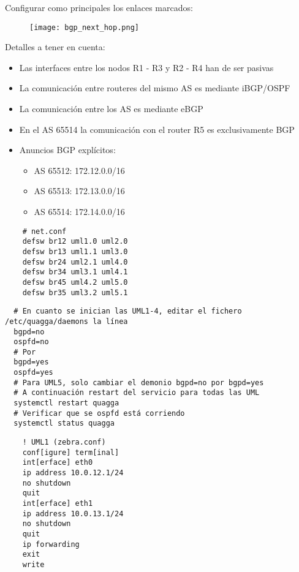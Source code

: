 Configurar como principales los enlaces marcados:
  \begin{figure}[h]
    \texttt{[image: bgp\_next\_hop.png]}
  \end{figure}

  Detalles a tener en cuenta:

  \begin{itemize}
    \item Las interfaces entre los nodos R1 - R3 y R2 - R4 han de ser pasivas
    \item La comunicación entre routeres del mismo AS es mediante iBGP/OSPF
    \item La comunicación entre los AS es mediante eBGP
    \item En el AS 65514 la comunicación con el router R5 es exclusivamente BGP
    \item Anuncios BGP explícitos:
    \begin{itemize}
      \item AS 65512: 172.12.0.0/16
      \item AS 65513: 172.13.0.0/16
      \item AS 65514: 172.14.0.0/16
    \end{itemize}
  \end{itemize}

  \begin{verbatim}
    # net.conf
    defsw br12 uml1.0 uml2.0
    defsw br13 uml1.1 uml3.0
    defsw br24 uml2.1 uml4.0
    defsw br34 uml3.1 uml4.1
    defsw br45 uml4.2 uml5.0
    defsw br35 uml3.2 uml5.1
  \end{verbatim}

  \begin{verbatim}
  # En cuanto se inician las UML1-4, editar el fichero /etc/quagga/daemons la línea
  bgpd=no
  ospfd=no
  # Por
  bgpd=yes
  ospfd=yes
  # Para UML5, solo cambiar el demonio bgpd=no por bgpd=yes
  # A continuación restart del servicio para todas las UML
  systemctl restart quagga
  # Verificar que se ospfd está corriendo
  systemctl status quagga
\end{verbatim}

  \begin{verbatim}
    ! UML1 (zebra.conf)
    conf[igure] term[inal]
    int[erface] eth0
    ip address 10.0.12.1/24
    no shutdown
    quit
    int[erface] eth1
    ip address 10.0.13.1/24
    no shutdown
    quit
    ip forwarding
    exit
    write
  \end{verbatim}

